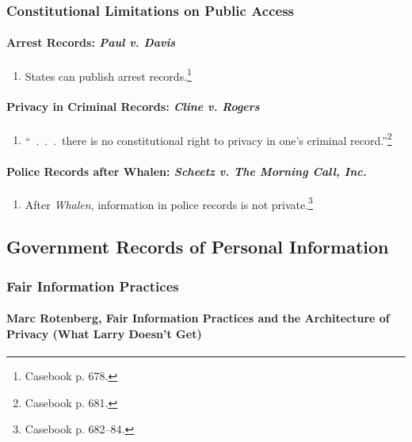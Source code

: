 \subsubsection{Constitutional Limitations on Public Access}

\paragraph{Arrest Records: \emph{Paul v. Davis}}

\begin{enumerate}
    \item States can publish arrest records.\footnote{Casebook p. 678.}
\end{enumerate}

\paragraph{Privacy in Criminal Records: \emph{Cline v. Rogers}}

\begin{enumerate}
    \item ``~.~.~.~there is no constitutional right to privacy in one's 
    criminal record.''\footnote{Casebook p. 681.}
\end{enumerate}

\paragraph{Police Records after Whalen: \emph{Scheetz v. The Morning Call, Inc.}}

\begin{enumerate}
    \item After \emph{Whalen}, information in police records is not 
    private.\footnote{Casebook p. 682--84.}
\end{enumerate}

\subsection{Government Records of Personal Information}

\subsubsection{Fair Information Practices}


\paragraph{Marc Rotenberg, Fair Information Practices and the Architecture of 
Privacy (What Larry Doesn't Get)} %

